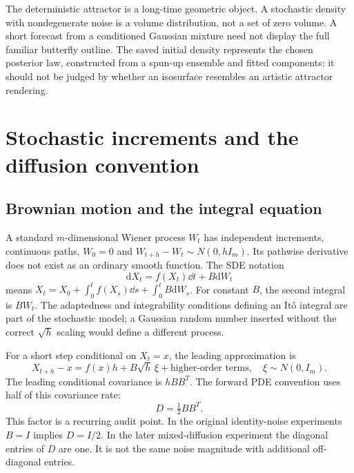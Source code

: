The deterministic attractor is a long-time geometric object. A stochastic density with nondegenerate noise is a volume distribution, not a set of zero volume. A short forecast from a conditioned Gaussian mixture need not display the full familiar butterfly outline. The saved initial density represents the chosen posterior law, constructed from a spun-up ensemble and fitted components; it should not be judged by whether an isosurface resembles an artistic attractor rendering.


\chapter{Stochastic increments and the diffusion convention}\label{ch:sde}
\section{Brownian motion and the integral equation}
A standard $m$-dimensional Wiener process $W_t$ has independent increments, continuous paths, $W_0=0$ and $W_{t+h}-W_t\sim N(0,hI_m)$. Its pathwise derivative does not exist as an ordinary smooth function. The SDE notation
\begin{equation}\label{eq:sde}
\mathrm dX_t=f(X_t)\dd t+B\mathrm dW_t
\end{equation}
means $X_t=X_0+\int_0^tf(X_s)\dd s+\int_0^tB\mathrm dW_s$. For constant $B$, the second integral is $BW_t$. The adaptedness and integrability conditions defining an It\^o integral are part of the stochastic model; a Gaussian random number inserted without the correct $\sqrt h$ scaling would define a different process.

For a short step conditional on $X_t=x$, the leading approximation is
\begin{equation}
X_{t+h}-x=f(x)h+B\sqrt h\,\xi+\text{higher-order terms},\quad \xi\sim N(0,I_m).
\end{equation}
The leading conditional covariance is $hBB^T$. The forward PDE convention uses half of this covariance rate:
\begin{equation}\label{eq:diffusion-convention}
D=\tfrac12BB^T.
\end{equation}
This factor is a recurring audit point. In the original identity-noise experiments $B=I$ implies $D=I/2$. In the later mixed-diffusion experiment the diagonal entries of $D$ are one. It is not the same noise magnitude with additional off-diagonal entries.

